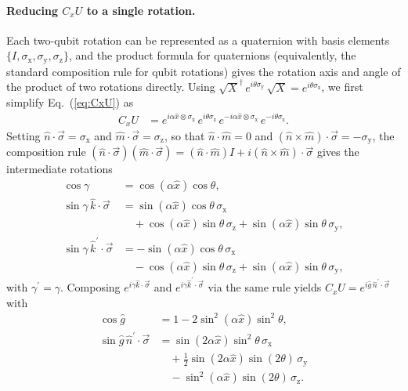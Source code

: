 \documentclass[aps,prx,showpacs,notitlepage,twocolumn,superscriptaddress,nofootinbib,preprintnumbers,floatfix,10pt, longbibliography]{revtex4-2}
\begin{document}
{\paragraph{Reducing $C_xU$ to a single rotation.}
Each two-qubit rotation can be represented as a quaternion with basis
elements $\{I,\sigma_\mathrm{x},\sigma_\mathrm{y},\sigma_\mathrm{z}\}$,
and the product formula for quaternions (equivalently, the standard
composition rule for qubit rotations) gives the rotation axis and
angle of the product of two rotations directly. Using
$\sqrt{X}^{\dagger}\,e^{i\theta\sigma_\mathrm{y}}\,\sqrt{X}
=e^{i\theta\sigma_\mathrm{z}}$, we first simplify Eq.~(\ref{eq:CxU})
as
\begin{align}
  C_xU
  &= e^{i\alpha\hat{x}\otimes\sigma_\mathrm{x}}\,
     e^{i\theta\sigma_\mathrm{z}}\,
     e^{-i\alpha\hat{x}\otimes\sigma_\mathrm{x}}\,
     e^{-i\theta\sigma_\mathrm{z}}.
\end{align}
Setting $\hat{n}\cdot\vec{\sigma}=\sigma_\mathrm{x}$ and
$\hat{m}\cdot\vec{\sigma}=\sigma_\mathrm{z}$, so that
$\hat{n}\cdot\hat{m}=0$ and
$(\hat{n}\times\hat{m})\cdot\vec{\sigma}=-\sigma_\mathrm{y}$, the
composition rule
$(\hat{n}\cdot\vec{\sigma})(\hat{m}\cdot\vec{\sigma})
=(\hat{n}\cdot\hat{m})I+i(\hat{n}\times\hat{m})\cdot\vec{\sigma}$
gives the intermediate rotations
\begin{align}
  \cos\gamma &= \cos(\alpha\hat{x})\cos\theta,\\
  \sin\gamma\,\hat{k}\cdot\vec{\sigma}
    &= \sin(\alpha\hat{x})\cos\theta\,\sigma_\mathrm{x} \nonumber\\
    &\quad +\cos(\alpha\hat{x})\sin\theta\,\sigma_\mathrm{z}
       +\sin(\alpha\hat{x})\sin\theta\,\sigma_\mathrm{y},\\
  \sin\gamma\,\hat{k}^\prime\cdot\vec{\sigma}
    &= -\sin(\alpha\hat{x})\cos\theta\,\sigma_\mathrm{x} \nonumber\\
    &\quad -\cos(\alpha\hat{x})\sin\theta\,\sigma_\mathrm{z}
       +\sin(\alpha\hat{x})\sin\theta\,\sigma_\mathrm{y},
\end{align}
with $\gamma^\prime=\gamma$. Composing
$e^{i\gamma\hat{k}\cdot\vec{\sigma}}$ and
$e^{i\gamma\hat{k}^\prime\cdot\vec{\sigma}}$ via the same rule yields
$C_xU=e^{i\hat{g}\,\hat{n}^\prime\cdot\vec{\sigma}}$ with
\begin{align}
  \cos\hat{g}
    &= 1 - 2\sin^2(\alpha\hat{x})\sin^2\theta,
    \label{eq:start_phase_est}\\
  \sin\hat{g}\,\hat{n}^\prime\cdot\vec{\sigma}
    &= \sin(2\alpha\hat{x})\sin^2\theta\,\sigma_\mathrm{x} \nonumber\\
    &\quad +\tfrac{1}{2}\sin(2\alpha\hat{x})\sin(2\theta)\,\sigma_\mathrm{y} \nonumber\\
    &\quad -\sin^2(\alpha\hat{x})\sin(2\theta)\,\sigma_\mathrm{z}.
       \label{eq:end_phase_est}
\end{align}

}
\end{document}
